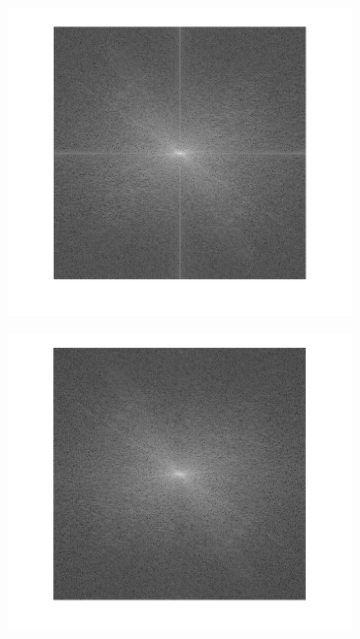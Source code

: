 \documentclass[12pt,a4paper,onecolumn]{article}
\begin{document}
\begin{figure}[H]
	\centering
	\begin{subfigure}[b]{\textwidth}
		\centering
		\includegraphics[height = 0.25\textheight]{tf_mod_init}
		\label{fig_11_tf_mod_init}
	\end{subfigure}
	\begin{subfigure}[b]{0.4\textwidth}
		\centering
		\includegraphics[height = 0.25\textheight]{tf_mod_per}

\end{subfigure}
\end{figure}
\end{document}

